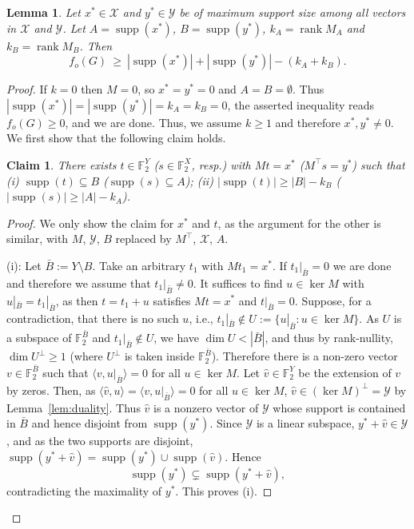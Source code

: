 \documentclass[11pt]{article}
\newtheorem{lemma}[theorem]{Lemma}
\newtheorem{claim}[theorem]{Claim}
\theoremstyle{definition}
\theoremstyle{remark}
\newcommand{\supp}{\operatorname{supp}}
\newcommand{\fo}{f_o}
\newcommand{\1}{\mathbf{1}}
\DeclareMathOperator{\rk}{rank}
\begin{document}
	\begin{lemma}\label{lem:boundintwoways}
		Let $x^{*}\in\mathcal{X}$ and $y^{*}\in\mathcal{Y}$ be of maximum support size among all vectors in $\mathcal{X}$ and $\mathcal{Y}$. Let $A=\supp(x^*)$, $B=\supp(y^*)$, $k_A=\rk M_A$ and
		$k_B=\rk M_B$. Then
		\[
		\fo(G)\ \ge\ |\supp(x^*)|+|\supp(y^*)|-(k_A+k_B).
		\]
	\end{lemma}
	\begin{proof}
		If $k=0$ then $M=0$, so $x^{*}=y^{*}=0$ and $A=B=\emptyset$. Thus $|\supp(x^*)|=|\supp(y^*)|=k_A=k_B=0$, the asserted inequality reads $\fo(G)\ge 0$, and we are done. Thus, we assume $k\geq 1$ and therefore $x^*, y^*\neq 0$. We first show that the following claim holds.
		\begin{claim}\label{cl:key}
			There exists $t\in\mathbb{F}_2^{Y}$ ($s\in\mathbb{F}_2^{X}$, resp.) with $Mt=x^*$ ($M^{\top} s=y^*$) such that  (i) $\supp(t)\subseteq B$ ($\supp(s)\subseteq A$); (ii) $|\supp(t)|\geq |B|-k_B$ ($|\supp(s)|\geq |A|-k_A$).
		\end{claim}
		\begin{proof}
			We only show the claim for $x^*$ and $t$, as the argument for the other is similar, with $M$, $\mathcal{Y}$, $B$ replaced by $M^{\top}$, $\mathcal{X}$, $A$.
			
			(i): Let $\bar B:= Y\setminus B$. Take an arbitrary $t_1$ with $Mt_1=x^*$. If $t_1|_{\bar B}=0$ we are done and therefore we assume that $t_1|_{\bar B}\neq 0$. It suffices to find $u\in\ker M$ with $u|_{\bar B}=t_1|_{\bar B}$, as then $t=t_1+u$ satisfies $Mt=x^*$ and $t|_{\bar B}=0$. Suppose, for a contradiction, that there is no such $u$, i.e., $t_1|_{\bar B}\notin U:=\{u|_{\bar B}: u\in \ker M\}$. As $U$ is a subspace of $\mathbb{F}_2^{\bar B}$ and $t_1|_{\bar B}\notin U$, we have $\dim U<|\bar B|$, and thus by rank-nullity, $\dim U^{\perp}\ge1$ (where $U^{\perp}$ is taken inside $\mathbb{F}_2^{\bar B}$). Therefore there is a non-zero vector $v\in \mathbb{F}_2^{\bar B}$ such that $\langle v,u|_{\bar B}\rangle=0$ for all $u\in\ker M$. Let $\hat v\in\mathbb{F}_2^{Y}$ be the extension of $v$ by
			zeros. Then, as $\langle\hat v,u\rangle=\langle v,u|_{\bar B}\rangle=0$ for all $u\in\ker M$, $\hat v\in(\ker M)^{\perp}=\mathcal{Y}$ by Lemma~\ref{lem:duality}. Thus $\hat v$ is a nonzero vector of $\mathcal{Y}$ whose support is contained in $\bar B$ and hence disjoint from $\supp(y^{*})$. Since $\mathcal{Y}$ is a linear subspace, $y^{*}+\hat v\in\mathcal{Y}$, and as the two supports are disjoint,
			$\supp(y^{*}+\hat v)=\supp(y^{*})\cup\supp(\hat v)$. Hence
			\[
			\supp(y^*)\subsetneq\supp(y^{*}+\hat v),
			\]
			contradicting the maximality of $y^{*}$. This proves (i).
			

\end{proof}
\end{proof}
\end{document}
